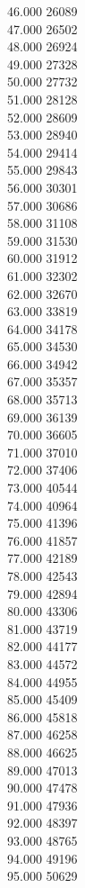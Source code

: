 { 46.000	26089 \\
 47.000	26502 \\
 48.000	26924 \\
 49.000	27328 \\
 50.000	27732 \\
 51.000	28128 \\
 52.000	28609 \\
 53.000	28940 \\
 54.000	29414 \\
 55.000	29843 \\
 56.000	30301 \\
 57.000	30686 \\
 58.000	31108 \\
 59.000	31530 \\
 60.000	31912 \\
 61.000	32302 \\
 62.000	32670 \\
 63.000	33819 \\
 64.000	34178 \\
 65.000	34530 \\
 66.000	34942 \\
 67.000	35357 \\
 68.000	35713 \\
 69.000	36139 \\
 70.000	36605 \\
 71.000	37010 \\
 72.000	37406 \\
 73.000	40544 \\
 74.000	40964 \\
 75.000	41396 \\
 76.000	41857 \\
 77.000	42189 \\
 78.000	42543 \\
 79.000	42894 \\
 80.000	43306 \\
 81.000	43719 \\
 82.000	44177 \\
 83.000	44572 \\
 84.000	44955 \\
 85.000	45409 \\
 86.000	45818 \\
 87.000	46258 \\
 88.000	46625 \\
 89.000	47013 \\
 90.000	47478 \\
 91.000	47936 \\
 92.000	48397 \\
 93.000	48765 \\
 94.000	49196 \\
 95.000	50629 \\
}
